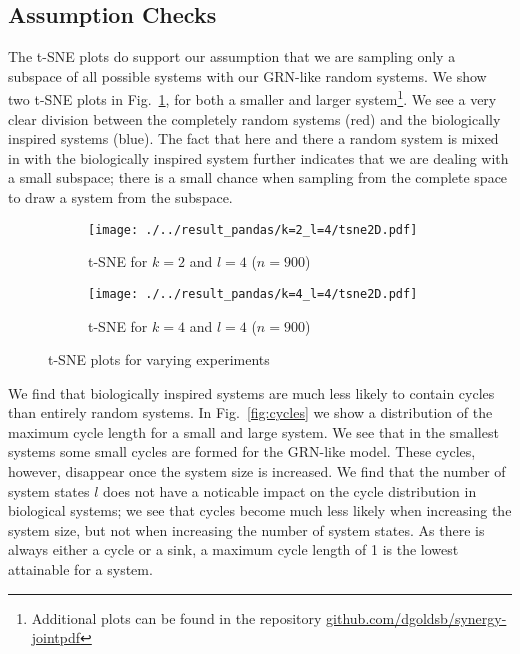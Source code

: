 \documentclass[../main.tex]{subfiles}
\begin{document}
\subsection{Assumption Checks}

The t-SNE plots do support our assumption that we are sampling only a subspace of all possible systems with our GRN-like random systems.
We show two t-SNE plots in Fig.~\ref{fig:TSNE}, for both a smaller and larger system\footnote{Additional plots can be found in the repository \url{github.com/dgoldsb/synergy-jointpdf}}.
We see a very clear division between the completely random systems (red) and the biologically inspired systems (blue).
The fact that here and there a random system is mixed in with the biologically inspired system further indicates that we are dealing with a small subspace; there is a small chance when sampling from the complete space to draw a system from the subspace.

\begin{figure}[H]
    \centering
    \begin{subfigure}[b]{0.4\textwidth}
        \texttt{[image: ./../result\_pandas/k=2\_l=4/tsne2D.pdf]}
        \caption{t-SNE for $k=2$ and $l=4$ ($n=900$)}
    \end{subfigure}
    \begin{subfigure}[b]{0.4\textwidth}
        \texttt{[image: ./../result\_pandas/k=4\_l=4/tsne2D.pdf]}
        \caption{t-SNE for $k=4$ and $l=4$ ($n=900$)}
    \end{subfigure}
    \caption{t-SNE plots for varying experiments}
    \label{fig:TSNE}
\end{figure}

We find that biologically inspired systems are much less likely to contain cycles than entirely random systems.
In Fig.~\ref{fig:cycles} we show a distribution of the maximum cycle length for a small and large system.
We see that in the smallest systems some small cycles are formed for the GRN-like model.
These cycles, however, disappear once the system size is increased.
We find that the number of system states $l$ does not have a noticable impact on the cycle distribution in biological systems; we see that cycles become much less likely when increasing the system size, but not when increasing the number of system states. %
As there is always either a cycle or a sink, a maximum cycle length of 1 is the lowest attainable for a system.
\end{document}
